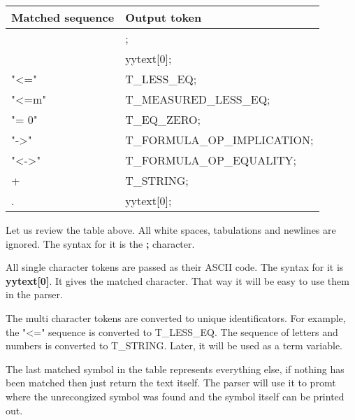 \documentclass{article}
\begin{document}
		\begin{flushleft}
			\centering
			\begin{tabular}{ | m{10em} | m{15em}| } 
				\hline
					\textbf{Matched sequence} & \textbf{Output token} \\ [0.7ex] 
				\hline
					[ \textbackslash t\textbackslash  n] & ; \\
				\hline
					[,TF01()C\&|~*+-] 	& yytext[0];  \\
				\hline
				    "<="            &   T\_LESS\_EQ; \\
				\hline
				    "<=m"           &   T\_MEASURED\_LESS\_EQ; \\
				\hline
				    "= 0"           &   T\_EQ\_ZERO; \\
				\hline
				    "->"            &   T\_FORMULA\_OP\_IMPLICATION; \\
				\hline
				    "<->"           &   T\_FORMULA\_OP\_EQUALITY; \\
				\hline
				    [a-zA-Z0-9]+    &   T\_STRING; \\
				\hline
				    .               &   yytext[0]; \\
				\hline
			\end{tabular}
		\end{flushleft}
	Let us review the table above. All white spaces, tabulations and newlines are ignored. The syntax for it is the \textbf{;} character.

	All single character tokens are passed as their ASCII code. The syntax for it is \textbf{yytext[0]}. It gives the matched character. That way it will be easy to use them in the parser.

	The multi character tokens are converted to unique identificators. For example, the "<=" sequence is converted to T\_LESS\_EQ. The sequence of letters and numbers is converted to T\_STRING. Later, it will be used as a term variable.

	The last matched symbol in the table represents everything else, if nothing has been matched then just return the text itself.
	The parser will use it to promt where the unrecongized symbol was found and the symbol itself can be printed out.

\end{document}
